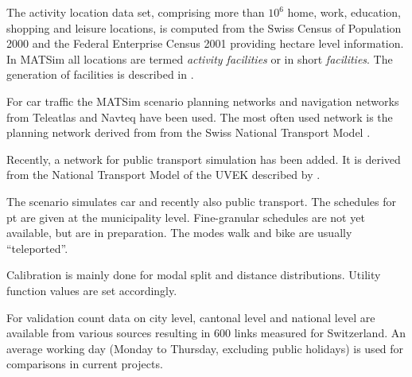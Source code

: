 The activity location data set, comprising more than $10^6$ home, work, education, shopping and leisure locations, is computed from the Swiss Census of Population 2000 and the Federal Enterprise Census 2001 \citep[][]{SwissEnterpriseCensus_manual_2001} providing hectare level information. In MATSim all locations are termed \emph{activity facilities} or in short \emph{facilities}. The generation of facilities is described in \citet[][p.33]{BalmerEtAl_ResRep_bdktzrh_2009}.

For car traffic the MATSim scenario planning networks and navigation networks from Teleatlas \citep[][]{MultiNet_Webpage_2010} and Navteq \citep[][]{Navteq_2011} have been used. The most often used network is the planning network derived from from the Swiss National Transport Model \citep[][]{VrticEtAl_BiegerEtAl_2003}.

Recently, a network for public transport simulation has been added. It is derived from the National Transport Model of the UVEK described by \citet[][]{VrticFroehlich_ResRep_UVEK_2010}. 

The scenario simulates car and recently also public transport. The schedules for pt are given at the municipality level. Fine-granular schedules are not yet available, but are in preparation. The modes walk and bike are usually ``teleported''. 

Calibration is mainly done for modal split and distance distributions. Utility function values are set accordingly.

For validation count data on city level, cantonal level and national level \citep[][]{ASTRA_Webpage_2006} are available from various sources resulting in 600 links measured for Switzerland. An average working day (Monday to Thursday, excluding public holidays) is used for comparisons in current projects.

